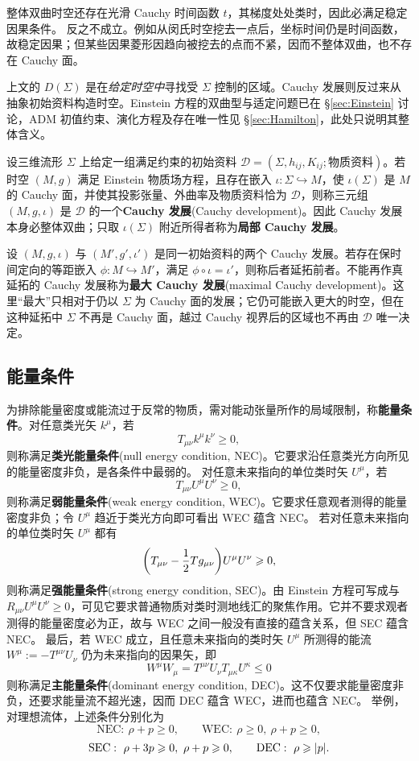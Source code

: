 整体双曲时空还存在光滑 Cauchy 时间函数 $t$，其梯度处处类时，因此必满足稳定因果条件。
反之不成立。例如从闵氏时空挖去一点后，坐标时间仍是时间函数，故稳定因果；但某些因果菱形因趋向被挖去的点而不紧，因而不整体双曲，也不存在 Cauchy 面。

上文的 $D(\Sigma)$ 是在\emph{给定时空中}寻找受 $\Sigma$ 控制的区域。Cauchy 发展则反过来从抽象初始资料构造时空。Einstein 方程的双曲型与适定问题已在 \S\ref{sec:Einstein} 讨论，ADM 初值约束、演化方程及存在唯一性见 \S\ref{sec:Hamilton}，此处只说明其整体含义。

设三维流形 $\Sigma$ 上给定一组满足约束的初始资料 $\mathcal D=(\Sigma,h_{ij},K_{ij};\text{物质资料})$。若时空 $(M,g)$ 满足 Einstein 物质场方程，且存在嵌入 $\iota:\Sigma\hookrightarrow M$，使 $\iota(\Sigma)$ 是 $M$ 的 Cauchy 面，并使其投影张量、外曲率及物质资料恰为 $\mathcal D$，则称三元组 $(M,g,\iota)$ 是 $\mathcal D$ 的一个\textbf{Cauchy 发展}(Cauchy development)。因此 Cauchy 发展本身必整体双曲；只取 $\iota(\Sigma)$ 附近所得者称为\textbf{局部 Cauchy 发展}。

设 $(M,g,\iota)$ 与 $(M',g',\iota')$ 是同一初始资料的两个 Cauchy 发展。若存在保时间定向的等距嵌入 $\phi:M\hookrightarrow M'$，满足 $\phi\circ\iota=\iota'$，则称后者延拓前者。不能再作真延拓的 Cauchy 发展称为\textbf{最大 Cauchy 发展}(maximal Cauchy development)。这里“最大”只相对于仍以 $\Sigma$ 为 Cauchy 面的发展；它仍可能嵌入更大的时空，但在这种延拓中 $\Sigma$ 不再是 Cauchy 面，越过 Cauchy 视界后的区域也不再由 $\mathcal D$ 唯一决定。



\subsection{能量条件}
为排除能量密度或能流过于反常的物质，需对能动张量所作的局域限制，称\textbf{能量条件}。对任意类光矢 $k^\mu$，若
\[
    T_{\mu\nu}k^\mu k^\nu\geqslant 0,
\]
则称满足\textbf{类光能量条件}(null energy condition, NEC)。它要求沿任意类光方向所见的能量密度非负，是各条件中最弱的。
对任意未来指向的单位类时矢 $U^\mu$，若
\[
    T_{\mu\nu}U^\mu U^\nu\geqslant 0,
\]
则称满足\textbf{弱能量条件}(weak energy condition, WEC)。它要求任意观者测得的能量密度非负；令 $U^\mu$ 趋近于类光方向即可看出 WEC 蕴含 NEC。
若对任意未来指向的单位类时矢 $U^\mu$ 都有
\[
    \qty(T_{\mu\nu}-\frac{1}{2}Tg_{\mu\nu})U^\mu U^\nu\geqslant 0,
\]
则称满足\textbf{强能量条件}(strong energy condition, SEC)。由 Einstein 方程可写成与 $R_{\mu\nu}U^\mu U^\nu\geqslant 0$，可见它要求普通物质对类时测地线汇的聚焦作用。它并不要求观者测得的能量密度必为正，故与 WEC 之间一般没有直接的蕴含关系，但 SEC 蕴含 NEC。
最后，若 WEC 成立，且任意未来指向的类时矢 $U^\mu$ 所测得的能流 $W^\mu := -T^{\mu\nu} U_\nu$ 仍为未来指向的因果矢，即
\[W^\mu W_\mu = T^{\mu\nu} U_\nu T_{\mu\kappa} U^\kappa\leqslant 0\]
则称满足\textbf{主能量条件}(dominant energy condition, DEC)。这不仅要求能量密度非负，还要求能量流不超光速，因而 DEC 蕴含 WEC，进而也蕴含 NEC。
举例，对理想流体，上述条件分别化为
\[
    \mathrm{NEC}:\ \rho+p\geqslant0,\qquad
    \mathrm{WEC}:\ \rho\geqslant0,\ \rho+p\geqslant0,
\]
\[
    \mathrm{SEC}:\ \rho+3p\geqslant0,\ \rho+p\geqslant0,\qquad
    \mathrm{DEC}:\ \rho\geqslant\abs{p}.
\]

